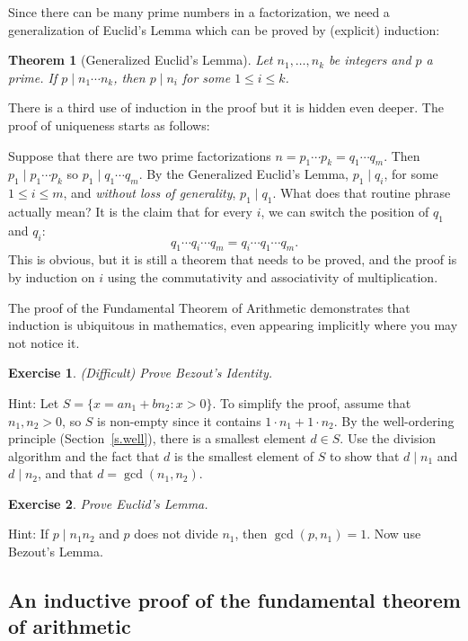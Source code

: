 \documentclass[11pt,a4paper]{report}
\newtheorem{theorem}{Theorem}
\newtheorem{exercise}{Exercise}
\begin{document}
Since there can be many prime numbers in a factorization, we need a generalization of Euclid's Lemma which can be proved by (explicit) induction:

\begin{theorem}[Generalized Euclid's Lemma]
Let $n_1,\ldots,n_k$ be integers and $p$ a prime. If $p \mid n_1 \cdots n_k$, then $p\mid n_i$ for some $1\leq i \leq k$.
\end{theorem}

There is a third use of induction in the proof but it is hidden even deeper. The proof of uniqueness starts as follows:

Suppose that there are two prime factorizations $n=p_1 \cdots p_k = q_1 \cdots q_m$. Then $p_1\mid p_1 \cdots p_k$ so $p_1 \mid q_1 \cdots q_m$. By the Generalized Euclid's Lemma, $p_1 \mid q_i$, for some $1\leq i \leq m$, and \emph{without loss of generality}, $p_1 \mid q_1$. What does that routine phrase actually mean? It is the claim that for every $i$, we can switch the position of $q_1$ and $q_i$:
\[
q_1 \cdots q_i \cdots q_m = q_i \cdots q_1 \cdots q_m.
\]
This is obvious, but it is still a theorem that needs to be proved, and the proof is by induction on $i$ using the commutativity and associativity of multiplication.

The proof of the Fundamental Theorem of Arithmetic demonstrates that induction is ubiquitous in mathematics, even appearing implicitly where you may not notice it.

\begin{exercise}
(Difficult) Prove Bezout's Identity.
\end{exercise}
Hint: Let $S=\{x = an_1+bn_2: x>0\}$. To simplify the proof, assume that $n_1,n_2>0$, so $S$ is non-empty since it contains $1\cdot n_1+1\cdot n_2$. By the well-ordering principle (Section~\ref{s.well}), there is a smallest element $d\in S$. Use the division algorithm and the fact that $d$ is the smallest element of $S$ to show that $d\mid n_1$ and $d\mid n_2$, and that $d=\gcd(n_1,n_2)$.

\begin{exercise}
Prove Euclid's Lemma.
\end{exercise}
Hint: If $p\mid n_1n_2$ and $p$ does not divide $n_1$, then $\gcd(p,n_1)=1$. Now use Bezout's Lemma.

\subsection*{An inductive proof of the fundamental theorem of arithmetic}
\end{document}
